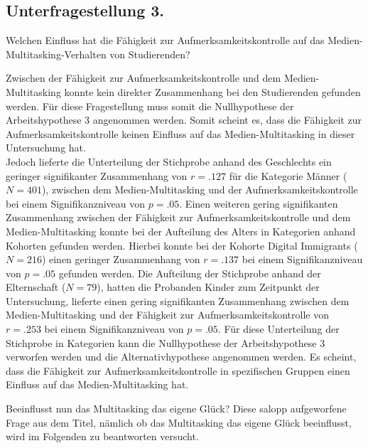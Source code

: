 \subsection{Unterfragestellung 3.} Welchen Einfluss hat die Fähigkeit zur Aufmerksamkeitskontrolle auf das Medien-Multitasking-Verhalten von Studierenden?

Zwischen der Fähigkeit zur Aufmerksamkeitskontrolle und dem Medien-Multitasking konnte kein direkter Zusammenhang bei den Studierenden gefunden werden. Für diese Fragestellung muss somit die Nullhypothese der Arbeitshypothese 3 angenommen werden. Somit scheint es, dass die Fähigkeit zur Aufmerksamkeitskontrolle keinen Einfluss auf das Medien-Multitasking in dieser Untersuchung hat. \\
Jedoch lieferte die Unterteilung der Stichprobe anhand des Geschlechts ein geringer signifikanter Zusammenhang von $r=.127$ für die Kategorie Männer ($N=401$), zwischen dem Medien-Multitasking und der Aufmerksamkeitskontrolle bei einem Signifikanzniveau von $p=.05$. Einen weiteren gering signifikanten Zusammenhang zwischen der Fähigkeit zur Aufmerksamkeitskontrolle und dem Medien-Multitasking konnte bei der Aufteilung des Alters in Kategorien anhand Kohorten gefunden werden. Hierbei konnte bei der Kohorte Digital Immigrants ($N=216$) einen geringer Zusammenhang von $r=.137$ bei einem Signifikanzniveau von $p=.05$ gefunden werden. Die Aufteilung der Stichprobe anhand der Elternschaft ($N=79$), hatten die Probanden Kinder zum Zeitpunkt der Untersuchung, lieferte einen gering signifikanten Zusammenhang zwischen dem Medien-Multitasking und der Fähigkeit zur Aufmerksamkeitskontrolle von $r=.253$ bei einem Signifikanzniveau von $p=.05$. Für diese Unterteilung der Stichprobe in Kategorien kann die Nullhypothese der Arbeitshypothese 3 verworfen werden und die Alternativhypothese angenommen werden. Es scheint, dass die Fähigkeit zur Aufmerksamkeitskontrolle in spezifischen Gruppen einen Einfluss auf das Medien-Multitasking hat.

\label{section.diskussion.interpretation}
Beeinflusst nun das Multitasking das eigene Glück? Diese salopp aufgeworfene Frage aus dem Titel, nämlich ob das Multitasking das eigene Glück beeinflusst, wird im Folgenden zu beantworten versucht.
 
